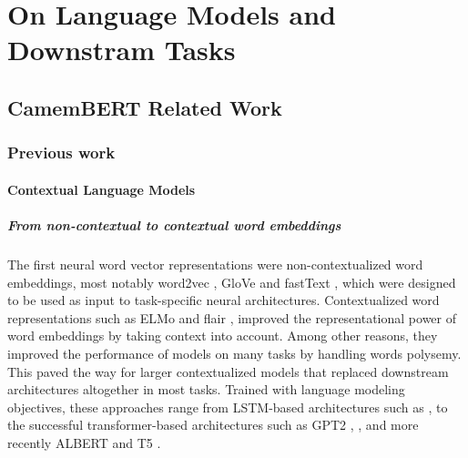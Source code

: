 \chapter{On Language Models and Downstram Tasks}


\section{CamemBERT Related Work}

\subsection{Previous work}
\label{relatedwork}
\subsubsection{Contextual Language Models}
\paragraph{From non-contextual to contextual word embeddings}
The first neural word vector representations were non-contextualized word embeddings, most notably
word2vec \citep{mikolov-etal-2013-distributed}, GloVe \cite{pennington-etal-2014-glove} and fastText \cite{mikolov-etal-2018-advances}, which were designed to be used as input to task-specific neural architectures.
Contextualized word representations such as ELMo \cite{peters-etal-2018-deep} and flair \cite{akbik-etal-2018-contextual}, improved the representational power of word embeddings by taking context into account. Among other reasons, they improved the performance of models on many tasks by handling words polysemy.
This paved the way for larger contextualized models that replaced downstream architectures altogether in most tasks. Trained with language modeling objectives, these approaches range from LSTM-based architectures such as \cite{dai-le-2015-semi}, to the successful transformer-based architectures such
as GPT2 \cite{radford-etal-2019-language}, \bert \cite{devlin-etal-2019-bert}, \roberta \cite{liu-etal-2019-roberta} and more recently ALBERT \cite{lan-etal-2020-albert} and T5 \cite{raffel-etal-2020-exploring}.



